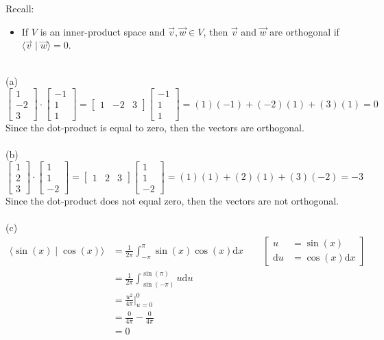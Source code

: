\documentclass{report}
\begin{document}
\begin{note}
Recall:
\begin{itemize}
\item If $V$ is an inner-product space and $\vec{v},\vec{w}\in V$,  then $\vec{v}$ and $\vec{w}$ are orthogonal if $\langle \vec{v} \mid \vec{w} \rangle = 0$.
\end{itemize}
\end{note}
\sol \\
(a)
$$\begin{bmatrix}1\\-2\\3\end{bmatrix}\cdot\begin{bmatrix}-1\\1\\1\end{bmatrix}=\begin{bmatrix}1&-2&3\end{bmatrix}\begin{bmatrix}-1\\1\\1\end{bmatrix}=(1)(-1)+(-2)(1)+(3)(1)=0
$$
Since the dot-product is equal to zero,  then the vectors are orthogonal.  \\
\\
\noindent(b)
$$\begin{bmatrix}1\\2\\3\end{bmatrix}\cdot\begin{bmatrix}1\\1\\-2\end{bmatrix}=\begin{bmatrix}1&2&3\end{bmatrix}\begin{bmatrix}1\\1\\-2\end{bmatrix}=(1)(1)+(2)(1)+(3)(-2)=-3
$$
Since the dot-product does not equal zero,  then the vectors are not orthogonal.  \\
\\
\noindent(c)
$$
\begin{aligned}
\langle \sin(x) \mid \cos(x) \rangle & = \frac{1}{2\pi}\int_{-\pi}^\pi \sin(x)\cos(x)\mathrm{d}x \qquad
\left[
\begin{aligned}
u &= \sin(x)\\
\mathrm{d}u &= \cos(x)\mathrm{d}x
\end{aligned}
\right]\\
&= \frac{1}{2\pi}\int_{\sin(-\pi)}^{\sin(\pi)} u\mathrm{d}u\\
&= \frac{u^2}{4\pi}\biggr\rvert_{u=0}^0\\
&= \frac{0}{4\pi}-\frac{0}{4\pi}\\
&= 0
\end{aligned}
$$
\end{document}
